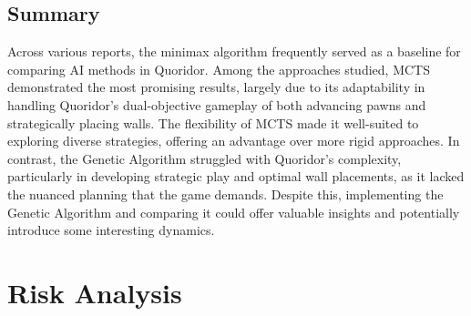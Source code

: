 \documentclass[review]{cmpreport}
\begin{document}
\subsection{Summary}
Across various reports, the minimax algorithm frequently served as a baseline for comparing AI methods in Quoridor. Among the approaches studied, MCTS demonstrated the most promising results, largely due to its adaptability in handling Quoridor’s dual-objective gameplay of both advancing pawns and strategically placing walls. The flexibility of MCTS made it well-suited to exploring diverse strategies, offering an advantage over more rigid approaches. In contrast, the Genetic Algorithm struggled with Quoridor’s complexity, particularly in developing strategic play and optimal wall placements, as it lacked the nuanced planning that the game demands. Despite this, implementing the Genetic Algorithm and comparing it could offer valuable insights and potentially introduce some interesting dynamics.

\newpage


\newpage
\appendix
\section{Risk Analysis}

\centering
{}
\newpage
\end{document}
